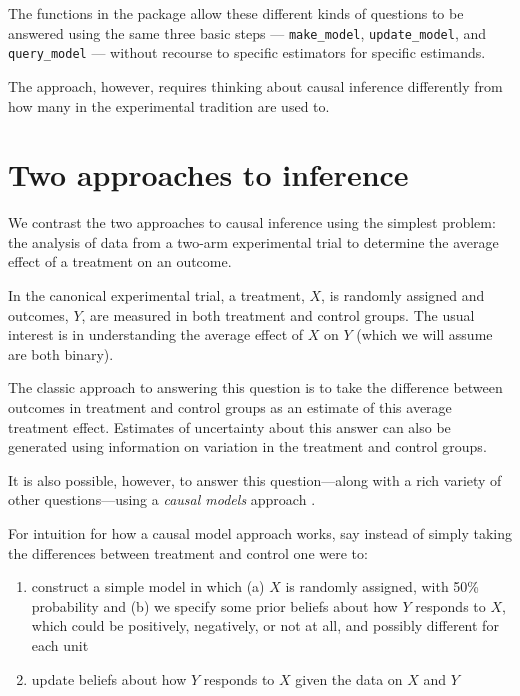 \documentclass[
  12pt,
]{book}
\begin{document}
The functions in the package allow these different kinds of questions to be answered using the same three basic steps --- \texttt{make\_model}, \texttt{update\_model}, and \texttt{query\_model} --- without recourse to specific estimators for specific estimands.

The approach, however, requires thinking about causal inference differently from how many in the experimental tradition are used to.

\hypertarget{two-approaches-to-inference}{%
\section{Two approaches to inference}\label{two-approaches-to-inference}}

We contrast the two approaches to causal inference using the simplest problem: the analysis of data from a two-arm experimental trial to determine the average effect of a treatment on an outcome.

In the canonical experimental trial, a treatment, \(X\), is randomly assigned and outcomes, \(Y\), are measured in both treatment and control groups. The usual interest is in understanding the average effect of \(X\) on \(Y\) (which we will assume are both binary).

The classic approach to answering this question is to take the difference between outcomes in treatment and control groups as an estimate of this average treatment effect. Estimates of uncertainty about this answer can also be generated using information on variation in the treatment and control groups.

It is also possible, however, to answer this question---along with a rich variety of other questions---using a \emph{causal models} approach \citep{pearl2009causality}.

For intuition for how a causal model approach works, say instead of simply taking the differences between treatment and control one were to:

\begin{enumerate}
\def\labelenumi{\arabic{enumi}.}
\item
  construct a simple model in which (a) \(X\) is randomly assigned, with 50\% probability and (b) we specify some prior beliefs about how \(Y\) responds to \(X\), which could be positively, negatively, or not at all, and possibly different for each unit
\item
  update beliefs about how \(Y\) responds to \(X\) given the data on \(X\) and \(Y\)
\end{enumerate}
\end{document}
